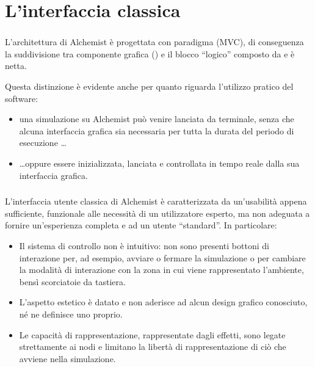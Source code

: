 
\section{L'interfaccia classica}\label{sec:old}
\begin{frame}
    \frametitle{\insertsection}
    L'architettura di Alchemist è progettata con paradigma  (MVC), di conseguenza la suddivisione tra componente grafica () e il blocco ``logico'' composto da  e  è netta.

    \medskip
    \pause

    Questa distinzione è evidente anche per quanto riguarda l'utilizzo pratico del software:

    \begin{itemize}[<+(1)->]
      \item
          una simulazione su Alchemist può venire lanciata da terminale, senza che alcuna interfaccia grafica sia necessaria per tutta la durata del periodo di esecuzione \ldots

      \item
          \ldots oppure essere inizializzata, lanciata e controllata in tempo reale dalla sua interfaccia grafica.
    \end{itemize}
\end{frame}

\begin{frame}
    \frametitle{\insertsection}
    \centering
\end{frame}

\begin{frame}
    \frametitle{\insertsection}

    L'interfaccia utente classica di Alchemist è caratterizzata da un'usabilità appena sufficiente, funzionale alle necessità di un utilizzatore esperto, ma non adeguata a fornire un'esperienza completa e  ad un utente ``standard''.
    In particolare:

    \begin{itemize}[<+(1)->]
      \item
          Il sistema di controllo non è intuitivo: non sono presenti bottoni di interazione per, ad esempio, avviare o fermare la simulazione o per cambiare la modalità di interazione con la zona in cui viene rappresentato l'ambiente, bensì scorciatoie da tastiera.
      \item
          L'aspetto estetico è datato e non aderisce ad alcun design grafico conosciuto, né ne definisce uno proprio.
      \item
          Le capacità di rappresentazione, rappresentate dagli effetti, sono legate strettamente ai nodi e limitano la libertà di rappresentazione di ciò che avviene nella simulazione.
    \end{itemize}
\end{frame}
